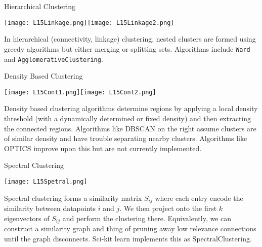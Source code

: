 \documentclass[10pt, table, dvipsnames,xcdraw, handout]{beamer}
\begin{document}
\begin{frame}[fragile]{Hierarchical Clustering}
  \begin{minipage}[t][0.5\textheight][t]{\textwidth}
	\centering \texttt{[image: L15Linkage.png]}\hspace{3em}\texttt{[image: L15Linkage2.png]} 
  \end{minipage}
  \vfill
\begin{minipage}[t][0.4\textheight][t]{\textwidth}
In hierarchical (connectivity, linkage) clustering, nested clusters are formed using greedy algorithms but either merging or splitting sets. \pause Algorithms include \texttt{Ward} and \texttt{AgglomerativeClustering}. 
\end{minipage}
\end{frame}


\begin{frame}[fragile]{Density Based Clustering}
  \begin{minipage}[t][0.5\textheight][t]{\textwidth}
	\centering \texttt{[image: L15Cont1.png]}\hspace{1em}\texttt{[image: L15Cont2.png]} 
  \end{minipage}
  \vfill
\begin{minipage}[t][0.5\textheight][t]{\textwidth}
Density based clustering algorithms determine regions by applying a local density threshold (with a dynamically determined or fixed density) and then extracting the connected regions. \pause Algorithms like DBSCAN on the right assume clusters are of similar density and have trouble separating nearby clusters. Algorithms like OPTICS improve upon this but are not currently implemented. 
\end{minipage}
\end{frame}


\begin{frame}[fragile]{Spectral Clustering}
  \begin{minipage}[t][0.5\textheight][t]{\textwidth}
	\centering \texttt{[image: L15Spetral.png]}
  \end{minipage}
  \vfill
\begin{minipage}[t][0.5\textheight][t]{\textwidth}
Spectral clustering forms a similarity matrix $S_{ij}$ where each entry encode the similarity between datapoints $i$ and $j$. We then project onto the first $k$ eigenvectors of $S_{ij}$ and perform the clustering there. \pause Equivalently, we can construct a similarity graph and thing of pruning away low relevance connections until the graph disconnects. Sci-kit learn implements this as SpectralClustering.
\end{minipage}
\end{frame}
\end{document}
